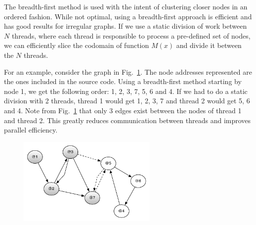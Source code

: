 The breadth-first method is used with the intent of clustering closer nodes in
an ordered fashion.  While not optimal, using a breadth-first approach is
efficient and has good results for irregular graphs. If we use a static division
of work between $N$ threads, where each thread is responsible to process a
pre-defined set of nodes, we can efficiently slice the codomain of function
$M(x)$ and divide it between the $N$ threads.

For an example, consider the graph in Fig.~\ref{fig:compiler:topology1}. The
node addresses represented are the ones included in the source code. Using a
breadth-first method starting by node 1, we get the following order: 1, 2, 3, 7,
5, 6 and 4. If we had to do a static division with 2 threads, thread 1 would get
1, 2, 3, 7 and thread 2 would get 5, 6 and 4. Note from
Fig.~\ref{fig:compiler:topology1} that only 3 edges exist between the nodes of
thread 1 and thread 2. This greatly reduces communication between threads and
improves parallel efficiency.

\begin{figure}[ht]
  \centering
  \includegraphics[width=0.6\textwidth]{figures/compiler/topology1.pdf}
  \label{fig:compiler:topology1}
\end{figure}
\fi

